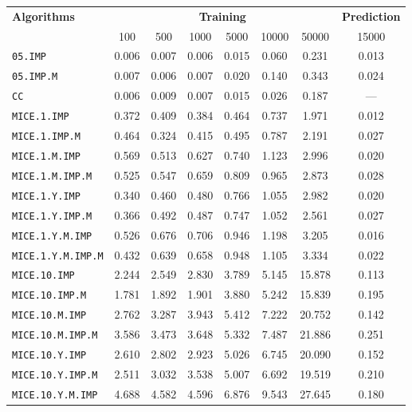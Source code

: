 \begin{table}[h!]
\centering
\begin{tabular}{l c c c c c c c}
\toprule
\textbf{Algorithms} & \multicolumn{6}{c}{\textbf{Training}} & \multicolumn{1}{c}{\textbf{Prediction}} \\
\cmidrule(lr){2-7} \cmidrule(lr){8-8}
& 100 & 500 & 1000 & 5000 & 10000 & 50000 & 15000 \\
\midrule
\texttt{05.IMP} & 0.006 & 0.007 & 0.006 & 0.015 & 0.060 & 0.231 & 0.013 \\
\texttt{05.IMP.M} & 0.007 & 0.006 & 0.007 & 0.020 & 0.140 & 0.343 & 0.024 \\
\texttt{CC} & 0.006 & 0.009 & 0.007 & 0.015 & 0.026 & 0.187 & --- \\
\texttt{MICE.1.IMP} & 0.372 & 0.409 & 0.384 & 0.464 & 0.737 & 1.971 & 0.012 \\
\texttt{MICE.1.IMP.M} & 0.464 & 0.324 & 0.415 & 0.495 & 0.787 & 2.191 & 0.027 \\
\texttt{MICE.1.M.IMP} & 0.569 & 0.513 & 0.627 & 0.740 & 1.123 & 2.996 & 0.020 \\
\texttt{MICE.1.M.IMP.M} & 0.525 & 0.547 & 0.659 & 0.809 & 0.965 & 2.873 & 0.028 \\
\texttt{MICE.1.Y.IMP} & 0.340 & 0.460 & 0.480 & 0.766 & 1.055 & 2.982 & 0.020 \\
\texttt{MICE.1.Y.IMP.M} & 0.366 & 0.492 & 0.487 & 0.747 & 1.052 & 2.561 & 0.027 \\
\texttt{MICE.1.Y.M.IMP} & 0.526 & 0.676 & 0.706 & 0.946 & 1.198 & 3.205 & 0.016 \\
\texttt{MICE.1.Y.M.IMP.M} & 0.432 & 0.639 & 0.658 & 0.948 & 1.105 & 3.334 & 0.022 \\
\texttt{MICE.10.IMP} & 2.244 & 2.549 & 2.830 & 3.789 & 5.145 & 15.878 & 0.113 \\
\texttt{MICE.10.IMP.M} & 1.781 & 1.892 & 1.901 & 3.880 & 5.242 & 15.839 & 0.195 \\
\texttt{MICE.10.M.IMP} & 2.762 & 3.287 & 3.943 & 5.412 & 7.222 & 20.752 & 0.142 \\
\texttt{MICE.10.M.IMP.M} & 3.586 & 3.473 & 3.648 & 5.332 & 7.487 & 21.886 & 0.251 \\
\texttt{MICE.10.Y.IMP} & 2.610 & 2.802 & 2.923 & 5.026 & 6.745 & 20.090 & 0.152 \\
\texttt{MICE.10.Y.IMP.M} & 2.511 & 3.032 & 3.538 & 5.007 & 6.692 & 19.519 & 0.210 \\
\texttt{MICE.10.Y.M.IMP} & 4.688 & 4.582 & 4.596 & 6.876 & 9.543 & 27.645 & 0.180 \\

\end{tabular}
\end{table}
